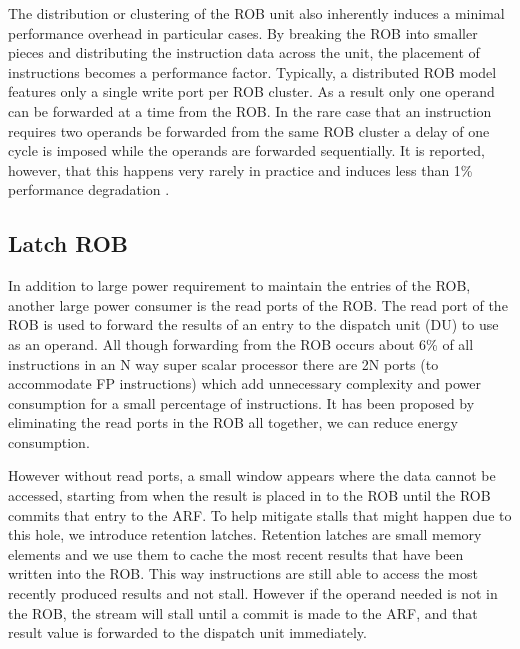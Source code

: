 The distribution or clustering of the ROB unit also inherently induces a minimal performance overhead 
in particular cases.  By breaking the ROB into smaller pieces and distributing the instruction 
data across the unit, the placement of instructions becomes a performance factor.  Typically, a 
distributed ROB model features only a single write port per ROB cluster.  As a result only one operand 
can be forwarded at a time from the ROB.  In the rare case that an instruction requires two operands be 
forwarded from the same ROB cluster a delay of one cycle is imposed while the operands are forwarded 
sequentially.  It is reported, however, that this happens very rarely in practice and induces less than 1\% 
performance degradation \cite{rabaey}.
\subsection{Latch ROB}
In addition to large power requirement to maintain the entries of the ROB, another 
large power consumer is the read ports of the ROB.  The read port of the ROB is used
to forward the results of an entry to the dispatch unit (DU) to use as an operand.
All though forwarding from the ROB occurs about 6\%\cite{kucuk} of all instructions 
in an N way super scalar processor there are 2N ports (to accommodate FP
 instructions) which add unnecessary complexity and power consumption for a small 
percentage of instructions.  It has been proposed by eliminating the read ports 
in the ROB all together, we can reduce energy consumption\cite{kucuk}.

However without read ports, a small window appears where the data cannot be accessed,
starting from when the result is placed in to the ROB until the ROB commits that 
entry to the ARF.  To help mitigate stalls that might happen due to this hole, 
we introduce retention latches.   Retention latches are small memory elements and 
we use them to cache the most recent results that have been written into the ROB.
This way instructions are still able to access the most recently produced results
and not stall.  However if the operand needed is not in the ROB, the stream will 
stall until a commit is made to the ARF, and that result value is forwarded to 
the dispatch unit immediately.

